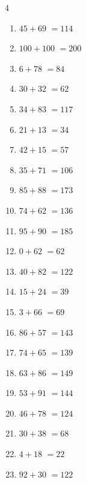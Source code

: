 \begin{multicols}{4}
\begin{enumerate}
  \item $45+69$
        $=114$

  \item $100+100$
        $=200$

  \item $6+78$
        $=84$

\columnbreak %

  \item $30+32$
        $=62$

  \item $34+83$
        $=117$

  \item $21+13$
        $=34$

  \item $42+15$
        $=57$

  \item $35+71$
        $=106$

  \item $85+88$
        $=173$

  \item $74+62$
        $=136$

  \item $95+90$
        $=185$

  \item $0+62$
        $=62$

  \item $40+82$
        $=122$

  \item $15+24$
        $=39$

  \item $3+66$
        $=69$

  \item $86+57$
        $=143$

  \item $74+65$
        $=139$

  \item $63+86$
        $=149$

  \item $53+91$
        $=144$

  \item $46+78$
        $=124$

  \item $30+38$
        $=68$

  \item $4+18$
        $=22$

  \item $92+30$
        $=122$


\end{enumerate}
\end{multicols}
